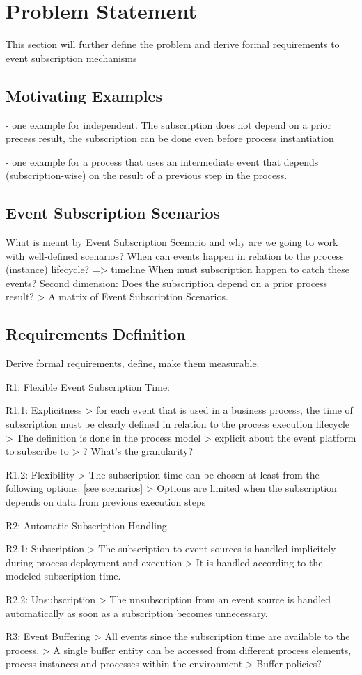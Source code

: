 \chapter{Problem Statement}\label{ch:problemstatement}

This section will further define the problem and derive formal requirements to event subscription mechanisms

\section{Motivating Examples}
- one example for independent. The subscription does not depend on a prior precess result, the subscription can be done even before process instantiation

- one example for a process that uses an intermediate event that depends (subscription-wise) on the result of a previous step in the process.

\section{Event Subscription Scenarios}
What is meant by Event Subscription Scenario and why are we going to work with well-defined scenarios?
When can events happen in relation to the process (instance) lifecycle? => timeline
When must subscription happen to catch these events?
Second dimension: Does the subscription depend on a prior process result?
> A matrix of Event Subscription Scenarios.

\section{Requirements Definition}
Derive formal requirements, define, make them measurable.

R1: Flexible Event Subscription Time:

R1.1: Explicitness
> for each event that is used in a business process, the time of subscription must be clearly defined in relation to the process execution lifecycle
> The definition is done in the process model
> explicit about the event platform to subscribe to
> ? What's the granularity?

R1.2: Flexibility
> The subscription time can be chosen at least from the following options: [see scenarios]
> Options are limited when the subscription depends on data from previous execution steps

R2: Automatic Subscription Handling

R2.1: Subscription
> The subscription to event sources is handled implicitely during process deployment and execution
> It is handled according to the modeled subscription time.

R2.2: Unsubscription
> The unsubscription from an event source is handled automatically as soon as a subscription becomes unnecessary.

R3: Event Buffering
> All events since the subscription time are available to the process.
> A single buffer entity can be accessed from different process elements, process instances and processes within the environment
> Buffer policies?

